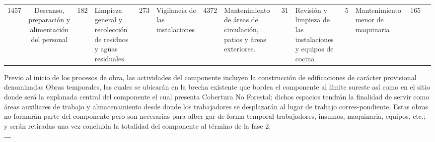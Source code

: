 \documentclass[twoside]{article}
\begin{document}
\begin{multicols}{2}
\begin{tabular}{ |p{ 7cm }|c|}
\scriptsize 1457 &

\hline


\scriptsize Descanso, preparación y alimentación del personal &

\scriptsize 182 &

\hline


\scriptsize Limpieza general y recolección de residuos y aguas residuales &

\scriptsize 273 &

\hline


\scriptsize Vigilancia de las instalaciones &

\scriptsize 4372 &

\hline


\scriptsize Mantenimiento de áreas de circulación, patios y áreas exteriores. &

\scriptsize 31 &

\hline


\scriptsize Revisión y limpieza de las instalaciones y equipos de cocina &

\scriptsize 5 &

\hline


\scriptsize Mantenimiento menor de maquinaria &

\scriptsize 165 &

\hline

\end{tabular}

\bigskip

Previo al inicio de los procesos de obra, las actividades del componente incluyen la construcción de edificaciones de carácter provisional denominadas Obras temporales, las cuales se ubicarán en la brecha existente que bordea el componente al límite sureste así como en el sitio donde será la explanada central del componente el cual presenta Cobertura No Forestal; dichos espacios tendrán la finalidad de servir como áreas auxiliares de trabajo y almacenamiento desde donde los trabajadores se desplazarán al lugar de trabajo corres-pondiente. Estas obras no formarán parte del componente pero son necesarias para alber-gar de forma temporal trabajadores, insumos, maquinaria, equipos, etc.; y serán retiradas una vez concluida la totalidad del componente al término de la fase 2.

\bigskip

\begin{tabular}{ |p{ 7cm }|c|}
\hline
\multicolumn{ 2 }{|l|}{\cellcolor{myblue1}\scriptsize\color{white}{ Datos generales del componente para esta fase }}\\
\hline



\end{tabular}
\end{multicols}
\end{document}
